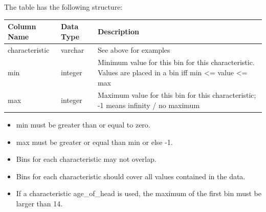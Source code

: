 The table has the following structure:


\begin{tabular}{|l|l|p{4.9in}|}
\hline
\textbf{Column Name} & \textbf{Data Type} & \textbf{Description} \\
\hline
characteristic & varchar & See above for examples  \\
\hline
min & integer & Minimum value for this bin for this characteristic.
Values are placed in a bin iff min \textless{}= value \textless{}= max  \\
\hline
max & integer & Maximum value for this bin for this characteristic; -1 means infinity / no maximum  \\
\hline

\end{tabular}

\begin{itemize} \tight
\item min must be greater than or equal to zero.
\item max must be greater or equal than min or else -1.
\item Bins for each characteristic may not overlap.
\item Bins for each characteristic should cover all values contained in the data.
\item If a characteristic age_of_head is used, the maximum of the first bin must be larger than 14.
\end{itemize}
